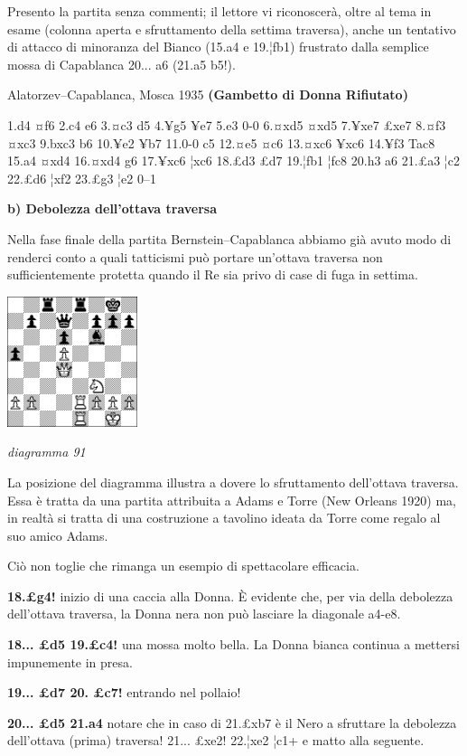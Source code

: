 \documentclass[
]{article}
\begin{document}
Presento la partita senza commenti; il lettore vi riconoscerà, oltre al
tema in esame (colonna aperta e sfruttamento della settima traversa),
anche un tentativo di attacco di minoranza del Bianco (15.a4 e 19.¦fb1)
frustrato dalla semplice mossa di Capablanca 20... a6 (21.a5 b5!).

Alatorzev--Capablanca, Mosca 1935 \textbf{(Gambetto di Donna Rifiutato)}

1.d4 ¤f6 2.c4 e6 3.¤c3 d5 4.¥g5 ¥e7 5.e3 0-0 6.¤xd5 ¤xd5 7.¥xe7 £xe7
8.¤f3 ¤xc3 9.bxc3 b6 10.¥e2 ¥b7 11.0-0 c5 12.¤e5 ¤c6 13.¤xc6 ¥xc6 14.¥f3
Tac8 15.a4 ¤xd4 16.¤xd4 g6 17.¥xc6 ¦xc6 18.£d3 £d7 19.¦fb1 ¦fc8 20.h3 a6
21.£a3 ¦c2 22.£d6 ¦xf2 23.£g3 ¦e2 0--1

\textbf{b) Debolezza dell'ottava traversa}

Nella fase finale della partita Bernstein--Capablanca abbiamo già avuto
modo di renderci conto a quali tatticismi può portare un'ottava traversa
non sufficientemente protetta quando il Re sia privo di case di fuga in
settima.

\includegraphics[width=1.5in,height=1.5in]{vertopal_109f12be458a423d8f3cc838880eaea2/media/image91.png}

\emph{diagramma 91}

La posizione del diagramma illustra a dovere lo sfruttamento dell'ottava
traversa. Essa è tratta da una partita attribuita a Adams e Torre (New
Orleans 1920) ma, in realtà si tratta di una costruzione a tavolino
ideata da Torre come regalo al suo amico Adams.

Ciò non toglie che rimanga un esempio di spettacolare efficacia.

\textbf{18.£g4!} inizio di una caccia alla Donna. È evidente che, per
via della debolezza dell'ottava traversa, la Donna nera non può lasciare
la diagonale a4-e8.

\textbf{18... £d5 19.£c4!} una mossa molto bella. La Donna bianca
continua a mettersi impunemente in presa.

\textbf{19... £d7 20. £c7!} entrando nel pollaio!

\textbf{20... £d5 21.a4} notare che in caso di 21.£xb7 è il Nero a
sfruttare la debolezza dell'ottava (prima) traversa! 21... £xe2! 22.¦xe2
¦c1+ e matto alla seguente.
\end{document}
